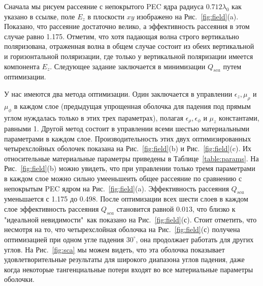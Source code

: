 \documentclass[a4paper, 12pt]{article}
\begin{document}
Сначала мы рисуем рассеяние с непокрытого PEC ядра радиуса $0.712\lambda_0$
как указано в ссылке, поле $E_z$ в плоскости $xy$ изображено на 
Рис.~\ref{fig:field}(a). Показано, что рассеяние достаточно велико, а 
эффективность рассеяния в этом случае равно 1.175. Отметим, что хотя 
падающая волна строго вертикально поляризована, отраженная волна в общем
случае состоит из обеих вертикальной и горизонтальной поляризации, где
только у вертикальной поляризации имеется компонента $E_z$. Следующее задание 
заключается в минимизации $Q_{sca}$ путем оптимизации.

У нас имеются два метода оптимизации. Один заключается в управлении 
$\epsilon_z, \mu_\rho$ и $\mu_\phi$ в каждом слое (предыдущая упрощенная
оболочка для падения под прямым углом \cite{3} нуждалась только в этих трех 
параметрах), полагая $\epsilon_\rho, \epsilon_\phi$ и $\mu_z$ константами,
равными 1. Другой метод состоит в управлении всеми шестью материальными 
параметрами в каждом слое. Производительность этих двух оптимизированных
четырехслойных оболочек показана на Рис.~\ref{fig:field}(b) и 
Рис.~\ref{fig:field}(c). Их относительные материальные параметры приведены
в Таблице~\ref{table:params}. На Рис.~\ref{fig:field}(b) можно увидеть,
что при управлении только тремя параметрами в каждом слое можно сильно
умееньшеить общее рассеяние по сравнению с непокрытым PEC ядром на 
Рис.~\ref{fig:field}(a). Эффективность рассеяния $Q_{sca}$ 
уменьшается с 1.175 до 0.498. После оптимизации всех шести слоев в каждом слое
эффективность рассеяния $Q_{sca}$ становится равной $0.013$, что близко
к "идеальной невидимости"\, как показано на Рис.~\ref{fig:field}(с).
Стоит отметить, что несмотря на то, что четырехслойная оболочка на 
Рис.~\ref{fig:field}(с) получена оптимизацией при одном угле падения 
$30^\circ$, она продолжает работать для других углов. На Рис.~\ref{fig:sca}
мы можем видеть, что эта оболочка показывает удовлетворительные результаты для
широкого диапазона углов падения, даже когда некоторые тангенциальные потери
входят во все материальные параметры оболочки.
\end{document}
